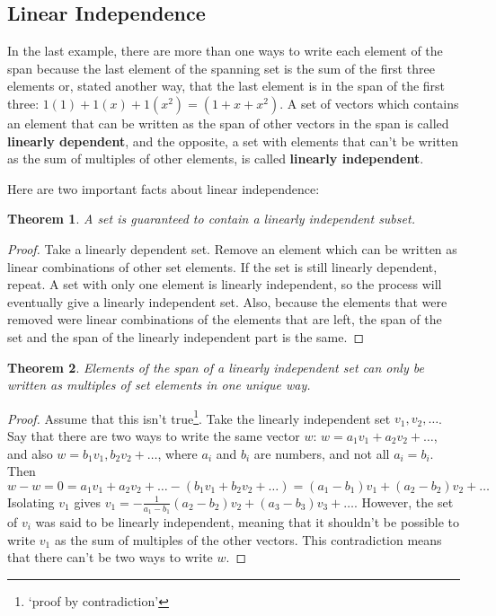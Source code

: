 \documentclass{article}
\newtheorem*{theorem}{Theorem}
\begin{document}
    \subsection{Linear Independence}
        In the last example, there are more than one ways to write each element of the span because the last element of the spanning set is the sum of the first three elements or, stated another way, that the last element is in the span of the first three: $1(1) + 1(x) + 1(x^2) = (1+x+x^2)$. A set of vectors which contains an element that can be written as the span of other vectors in the span is called \textbf{linearly dependent}, and the opposite, a set with elements that can't be written as the sum of multiples of other elements, is called \textbf{linearly independent}.
       
       Here are two important facts about linear independence:
       \begin{theorem}
           A set is guaranteed to contain a linearly independent subset.
       \end{theorem}
       \begin{proof}
           Take a linearly dependent set. Remove an element which can be written as linear combinations of other set elements. If the set is still linearly dependent, repeat. A set with only one element is linearly independent, so the process will eventually give a linearly independent set. Also, because the elements that were removed were linear combinations of the elements that are left, the span of the set and the span of the linearly independent part is the same.
       \end{proof}
       \begin{theorem}
       Elements of the span of a linearly independent set can only be written as multiples of set elements in one unique way.
       \end{theorem}
       \begin{proof}
           Assume that this isn't true\footnote{`proof by contradiction'}. Take the linearly independent set ${v_1, v_2, \dots}$. Say that there are two ways to write the same vector $w$: $w = a_1v_1 +a_2v_2 + \dots$, and also $w = b_1v_1, b_2v_2 + \dots$, where $a_i$ and $b_i$ are numbers, and not all $a_i = b_i$. Then $w - w = 0 = a_1 v_1 + a_2v_2 + \dots - (b_1 v_1 + b_2v_2 +\dots ) = (a_1 - b_1)v_1 + (a_2 - b_2)v_2 + \dots$ Isolating $v_1$ gives $v_1 = -\frac {1}{a_1 - b_1} (a_2 - b_2)v_2 + (a_3 - b_3)v_3 + \dots$. However, the set of $v_i$ was said to be linearly independent, meaning that it shouldn't be possible to write $v_1$ as the sum of multiples of the other vectors. This contradiction means that there can't be two ways to write $w$. 
       \end{proof}
\end{document}
